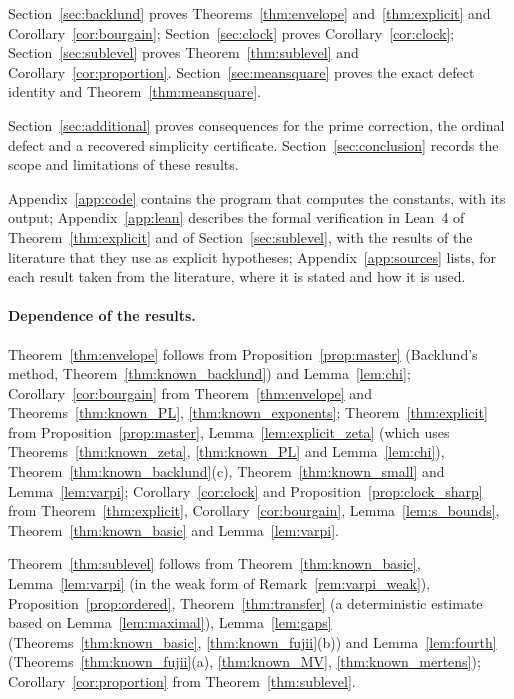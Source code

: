 \documentclass[11pt,a4paper]{article}
\makeatletter
\numberwithin{equation}{section}
\DeclareRobustCommand{\CGref}[1]{\ref{#1}}
\let\CG@origref\ref
\newcommand{\CG@gettip}[1]{\@ifundefined{CGTip@#1}{#1}{\csname CGTip@#1\endcsname}}
\DeclareRobustCommand{\CGref}[1]{\pdftooltip{\CG@origref{#1}}{\CG@gettip{#1}}}
\theoremstyle{definition}
\theoremstyle{remark}
\makeatother
\begin{document}
Section~\CGref{sec:backlund} proves Theorems~\CGref{thm:envelope} and~\CGref{thm:explicit} and Corollary~\CGref{cor:bourgain}; Section~\CGref{sec:clock} proves Corollary~\CGref{cor:clock}; Section~\CGref{sec:sublevel} proves Theorem~\CGref{thm:sublevel} and Corollary~\CGref{cor:proportion}. Section~\CGref{sec:meansquare} proves the exact defect identity and Theorem~\CGref{thm:meansquare}.

Section~\CGref{sec:additional} proves consequences for the prime correction, the ordinal defect and a recovered simplicity certificate. Section~\CGref{sec:conclusion} records the scope and limitations of these results.

Appendix~\CGref{app:code} contains the program that computes the constants, with its output; Appendix~\CGref{app:lean} describes the formal verification in Lean~4 of Theorem~\CGref{thm:explicit} and of Section~\CGref{sec:sublevel}, with the results of the literature that they use as explicit hypotheses; Appendix~\CGref{app:sources} lists, for each result taken from the literature, where it is stated and how it is used.

\paragraph{Dependence of the results.}
Theorem~\CGref{thm:envelope} follows from Proposition~\CGref{prop:master} (Backlund's method, Theorem~\CGref{thm:known_backlund}) and Lemma~\CGref{lem:chi}; Corollary~\CGref{cor:bourgain} from Theorem~\CGref{thm:envelope} and Theorems~\CGref{thm:known_PL}, \CGref{thm:known_exponents}; Theorem~\CGref{thm:explicit} from Proposition~\CGref{prop:master}, Lemma~\CGref{lem:explicit_zeta} (which uses Theorems~\CGref{thm:known_zeta}, \CGref{thm:known_PL} and Lemma~\CGref{lem:chi}), Theorem~\CGref{thm:known_backlund}(c), Theorem~\CGref{thm:known_small} and Lemma~\CGref{lem:varpi}; Corollary~\CGref{cor:clock} and Proposition~\CGref{prop:clock_sharp} from Theorem~\CGref{thm:explicit}, Corollary~\CGref{cor:bourgain}, Lemma~\CGref{lem:s_bounds}, Theorem~\CGref{thm:known_basic} and Lemma~\CGref{lem:varpi}.

Theorem~\CGref{thm:sublevel} follows from Theorem~\CGref{thm:known_basic}, Lemma~\CGref{lem:varpi} (in the weak form of Remark~\CGref{rem:varpi_weak}), Proposition~\CGref{prop:ordered}, Theorem~\CGref{thm:transfer} (a deterministic estimate based on Lemma~\CGref{lem:maximal}), Lemma~\CGref{lem:gaps} (Theorems~\CGref{thm:known_basic}, \CGref{thm:known_fujii}(b)) and Lemma~\CGref{lem:fourth} (Theorems~\CGref{thm:known_fujii}(a), \CGref{thm:known_MV}, \CGref{thm:known_mertens}); Corollary~\CGref{cor:proportion} from Theorem~\CGref{thm:sublevel}.
\end{document}
